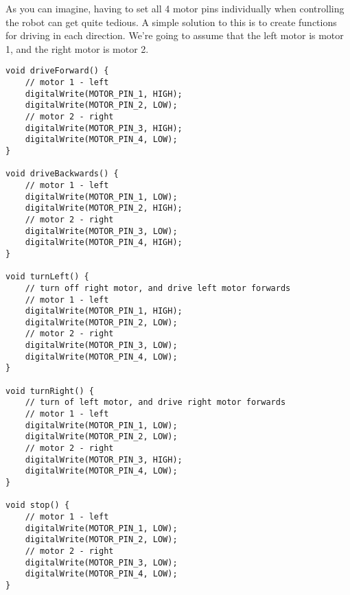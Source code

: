 \documentclass[../TinyBot.tex]{subfiles}
\begin{document}
As you can imagine, having to set all 4 motor pins individually when controlling the robot
can get quite tedious. A simple solution to this is to create functions for driving in
each direction. We're going to assume that the left motor is motor 1, and the right motor is
motor 2.

\begin{lstlisting}
void driveForward() {
    // motor 1 - left
    digitalWrite(MOTOR_PIN_1, HIGH);
    digitalWrite(MOTOR_PIN_2, LOW);
    // motor 2 - right
    digitalWrite(MOTOR_PIN_3, HIGH);
    digitalWrite(MOTOR_PIN_4, LOW);
}

void driveBackwards() {
    // motor 1 - left
    digitalWrite(MOTOR_PIN_1, LOW);
    digitalWrite(MOTOR_PIN_2, HIGH);
    // motor 2 - right
    digitalWrite(MOTOR_PIN_3, LOW);
    digitalWrite(MOTOR_PIN_4, HIGH);
}

void turnLeft() {
    // turn off right motor, and drive left motor forwards
    // motor 1 - left
    digitalWrite(MOTOR_PIN_1, HIGH);
    digitalWrite(MOTOR_PIN_2, LOW);
    // motor 2 - right
    digitalWrite(MOTOR_PIN_3, LOW);
    digitalWrite(MOTOR_PIN_4, LOW);
}

void turnRight() {
    // turn of left motor, and drive right motor forwards
    // motor 1 - left
    digitalWrite(MOTOR_PIN_1, LOW);
    digitalWrite(MOTOR_PIN_2, LOW);
    // motor 2 - right
    digitalWrite(MOTOR_PIN_3, HIGH);
    digitalWrite(MOTOR_PIN_4, LOW);
}

void stop() {
    // motor 1 - left
    digitalWrite(MOTOR_PIN_1, LOW);
    digitalWrite(MOTOR_PIN_2, LOW);
    // motor 2 - right
    digitalWrite(MOTOR_PIN_3, LOW);
    digitalWrite(MOTOR_PIN_4, LOW);
}
\end{lstlisting}
\end{document}
